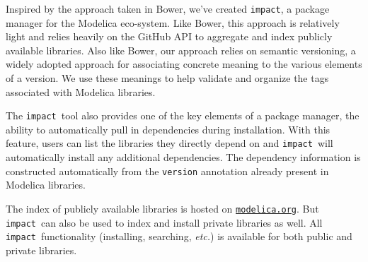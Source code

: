 \documentclass[11pt,a4paper,twocolumn]{article}
\newcommand{\impact}{\texttt{impact}} %
\newcommand{\code}[1]{\texttt{#1}} %
\begin{document}

Inspired by the approach taken in Bower, we've created \impact, a
package manager for the Modelica eco-system.  Like Bower, this
approach is relatively light and relies heavily on the GitHub API to
aggregate and index publicly available libraries.  Also like Bower,
our approach relies on semantic versioning, a widely adopted approach
for associating concrete meaning to the various elements of a version.
We use these meanings to help validate and organize the tags
associated with Modelica libraries.

The \impact\ tool also provides one of the key elements of a package
manager, the ability to automatically pull in dependencies during
installation.  With this feature, users can list the libraries they
directly depend on and \impact\ will automatically install any
additional dependencies.  The dependency information is constructed
automatically from the \code{version} annotation already present in
Modelica libraries.

The index of publicly available libraries is hosted on
\href{https://modelica.org}{\code{modelica.org}}.
But \impact\ can also be used to index and
install private libraries as well.  All \impact\ functionality
(installing, searching, \textit{etc.}) is available for both public
and private libraries.

\printbibliography
\end{document}

